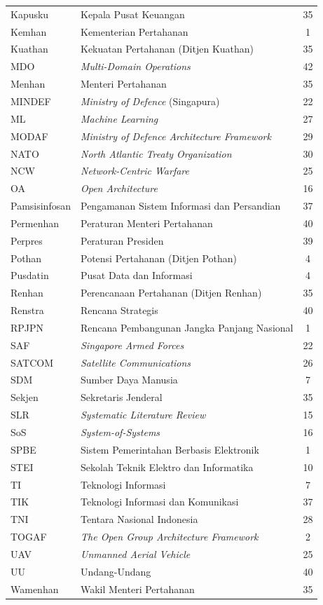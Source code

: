 \begin{longtable}{@{} l >{\raggedright\arraybackslash}p{7.5cm} c @{}}
Kapusku & Kepala Pusat Keuangan & 35 \\
Kemhan & Kementerian Pertahanan & 1 \\
Kuathan & Kekuatan Pertahanan (Ditjen Kuathan) & 35 \\
MDO & \textit{Multi-Domain Operations} & 42 \\
Menhan & Menteri Pertahanan & 35 \\
MINDEF & \textit{Ministry of Defence} (Singapura) & 22 \\
ML & \textit{Machine Learning} & 27 \\
MODAF & \textit{Ministry of Defence Architecture Framework} & 29 \\
NATO & \textit{North Atlantic Treaty Organization} & 30 \\
NCW & \textit{Network-Centric Warfare} & 25 \\
OA & \textit{Open Architecture} & 16 \\
Pamsisinfosan & Pengamanan Sistem Informasi dan Persandian & 37 \\
Permenhan & Peraturan Menteri Pertahanan & 40 \\
Perpres & Peraturan Presiden & 39 \\
Pothan & Potensi Pertahanan (Ditjen Pothan) & 4 \\
Pusdatin & Pusat Data dan Informasi & 4 \\
Renhan & Perencanaan Pertahanan (Ditjen Renhan) & 35 \\
Renstra & Rencana Strategis & 40 \\
RPJPN & Rencana Pembangunan Jangka Panjang Nasional & 1 \\
SAF & \textit{Singapore Armed Forces} & 22 \\
SATCOM & \textit{Satellite Communications} & 26 \\
SDM & Sumber Daya Manusia & 7 \\
Sekjen & Sekretaris Jenderal & 35 \\
SLR & \textit{Systematic Literature Review} & 15 \\
SoS & \textit{System-of-Systems} & 16 \\
SPBE & Sistem Pemerintahan Berbasis Elektronik & 1 \\
STEI & Sekolah Teknik Elektro dan Informatika & 10 \\
TI & Teknologi Informasi & 7 \\
TIK & Teknologi Informasi dan Komunikasi & 37 \\
TNI & Tentara Nasional Indonesia & 28 \\
TOGAF & \textit{The Open Group Architecture Framework} & 2 \\
UAV & \textit{Unmanned Aerial Vehicle} & 25 \\
UU & Undang-Undang & 40 \\
Wamenhan & Wakil Menteri Pertahanan & 35 \\


\end{longtable}